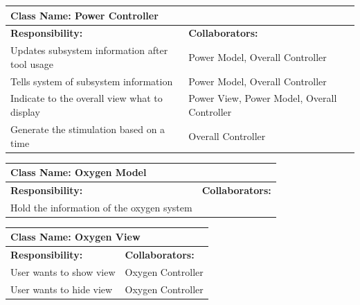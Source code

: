 \documentclass[12pt, titlepage]{article}
\begin{document}
\begin{enumerate}[a)]
	\begin{table}[H]
		\centering
		\begin{tabular}{|p{10cm}|p{5cm}|}
		\hline 
		 \multicolumn{2}{|l|}{\textbf{Class Name: Power Controller}} \\
		\hline
		\textbf{Responsibility:} & \textbf{Collaborators:} \\
		\hline
		Updates subsystem information after tool usage & Power Model, Overall Controller\\
		\hline
		 Tells system of subsystem information & Power Model, Overall Controller\\
		\hline
		 Indicate to the overall view what to display & Power View, Power Model, Overall Controller\\
		\hline
		 Generate the stimulation based on a time & Overall Controller \\
		\hline
		\end{tabular}
	\end{table}

	\begin{table}[H]
		\centering
		\begin{tabular}{|p{10cm}|p{5cm}|}
		\hline 
		 \multicolumn{2}{|l|}{\textbf{Class Name: Oxygen Model}} \\
		\hline
		\textbf{Responsibility:} & \textbf{Collaborators:} \\
		\hline
		 Hold the information of the oxygen system & \\
		\hline
		\end{tabular}
	\end{table}

	\begin{table}[H]
		\centering
		\begin{tabular}{|p{10cm}|p{5cm}|}
		\hline 
		 \multicolumn{2}{|l|}{\textbf{Class Name: Oxygen View}} \\
		\hline
		\textbf{Responsibility:} & \textbf{Collaborators:} \\
		\hline
		 User wants to show view & Oxygen Controller\\
		\hline
		User wants to hide view & Oxygen Controller\\
		\hline
		\end{tabular}
	\end{table}


\end{enumerate}
\end{document}

